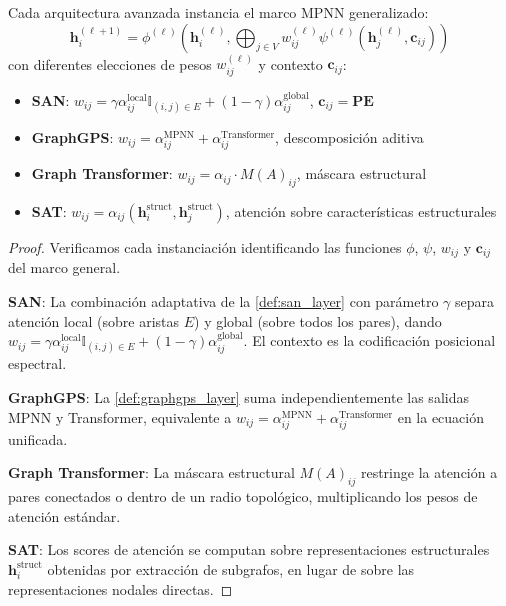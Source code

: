 \begin{proposition}\label{prop:unified_advanced_architectures}
Cada arquitectura avanzada instancia el marco MPNN generalizado:
\begin{equation}
    \mathbf{h}_i^{(\ell+1)} = \phi^{(\ell)}\left(\mathbf{h}_i^{(\ell)}, \bigoplus_{j \in V} w_{ij}^{(\ell)} \psi^{(\ell)}(\mathbf{h}_j^{(\ell)}, \mathbf{c}_{ij})\right)
    \label{eq:unified_mpnn_generalized}
\end{equation}
con diferentes elecciones de pesos $w_{ij}^{(\ell)}$ y contexto $\mathbf{c}_{ij}$:
\begin{itemize}
    \item \textbf{SAN}: $w_{ij} = \gamma \alpha_{ij}^{\text{local}} \mathbb{I}_{(i,j) \in E} + (1-\gamma) \alpha_{ij}^{\text{global}}$, $\mathbf{c}_{ij} = \mathbf{PE}$
    \item \textbf{GraphGPS}: $w_{ij} = \alpha_{ij}^{\text{MPNN}} + \alpha_{ij}^{\text{Transformer}}$, descomposición aditiva
    \item \textbf{Graph Transformer}: $w_{ij} = \alpha_{ij} \cdot M(A)_{ij}$, máscara estructural
    \item \textbf{SAT}: $w_{ij} = \alpha_{ij}(\mathbf{h}_i^{\text{struct}}, \mathbf{h}_j^{\text{struct}})$, atención sobre características estructurales
\end{itemize}
\end{proposition}

\begin{proof}
Verificamos cada instanciación identificando las funciones $\phi$, $\psi$, $w_{ij}$ y $\mathbf{c}_{ij}$ del marco general.

\textbf{SAN}: La combinación adaptativa de la \autoref{def:san_layer} con parámetro $\gamma$ separa atención local (sobre aristas $E$) y global (sobre todos los pares), dando $w_{ij} = \gamma \alpha_{ij}^{\text{local}} \mathbb{I}_{(i,j) \in E} + (1-\gamma) \alpha_{ij}^{\text{global}}$. El contexto es la codificación posicional espectral.

\textbf{GraphGPS}: La \autoref{def:graphgps_layer} suma independientemente las salidas MPNN y Transformer, equivalente a $w_{ij} = \alpha_{ij}^{\text{MPNN}} + \alpha_{ij}^{\text{Transformer}}$ en la ecuación unificada.

\textbf{Graph Transformer}: La máscara estructural $M(A)_{ij}$ restringe la atención a pares conectados o dentro de un radio topológico, multiplicando los pesos de atención estándar.

\textbf{SAT}: Los scores de atención se computan sobre representaciones estructurales $\mathbf{h}_i^{\text{struct}}$ obtenidas por extracción de subgrafos, en lugar de sobre las representaciones nodales directas.
\end{proof}


